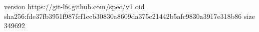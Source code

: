version https://git-lfs.github.com/spec/v1
oid sha256:fde37fb3951f987fcf1ccb30830a8609da375c21442b5afc9830a3917e318b86
size 349692
